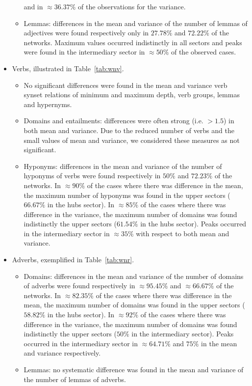 \begin{itemize}
\begin{itemize}
				and in $\approx 36.37\%$ of the observations for the variance.
			\item Lemmas:
				differences in the mean and variance of the number of lemmas of adjectives were found respectively only in $27.78\%$ and $72.22\%$ of the networks.
				Maximum values occurred indistinctly in all sectors and peaks were found in the intermediary sector in $\approx 50\%$ of the observed cases.
		\end{itemize}
	\item Verbs, illustrated in Table~\ref{tab:wnv}.

		\begin{itemize}
			\item No significant differences were found in the mean and variance verb synset relations of minimum and maximum depth, verb groups, lemmas and hypernyms.
			\item Domains and entailments:
				differences were often strong (i.e. $>1.5$) in both mean and variance.
				Due to the reduced number of verbs and the small values of mean and variance,
				we considered these measures as not significant.
			\item Hyponyms:
				differences in the mean and variance of the number of hyponyms of verbs were found respectively in $50\%$ and $72.23\%$ of the networks.
				In $\approx 90\%$ of the cases where there was difference in the mean, 
				the maximum number of hyponyms was found in the upper sectors ($66.67\%$ in the hubs sector).
				In $\approx 85\%$ of the cases where there was difference in the variance, 
				the maximum number of domains was found indistinctly the upper sectors ($61.54\%$ in the hubs sector).
				Peaks occurred in the intermediary sector in $\approx 35\%$ with respect to both mean and variance.
		\end{itemize}
	\item Adverbs, exemplified in Table~\ref{tab:wnr}.

		\begin{itemize}
			\item Domains:
				differences in the mean and variance of the number of domains of adverbs were found respectively in $\approx 95.45\%$ and $\approx 66.67\%$ of the networks.
				In $\approx 82.35\%$ of the cases where there was difference in the mean, 
				the maximum number of domains was found in the upper sectors ($58.82\%$ in the hubs sector).
				In $\approx 92\%$ of the cases where there was difference in the variance, 
				the maximum number of domains was found indistinctly the upper sectors ($50\%$ in the intermediary sector).
				Peaks occurred in the intermediary sector in $\approx 64.71\%$ and $75\%$ in the mean and variance respectively.
			\item Lemmas:
				no systematic difference was found in the mean and variance of the number of lemmas of adverbs.
		\end{itemize}
\end{itemize}
